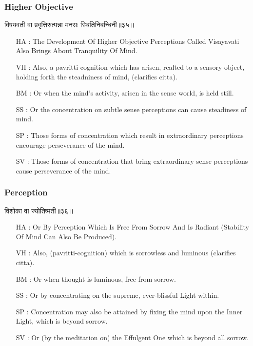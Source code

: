 \begin{frame}[fragile]\frametitle{Higher Objective}
\begin{sanskrit}
विषयवती वा प्रवृत्तिरुत्पन्ना मनसः स्थितिनिबन्धिनी॥३५॥
\end{sanskrit}

	\begin{itemize}
	\item [HA]: The Development Of Higher Objective Perceptions Called Visayavati Also Brings About Tranquility Of Mind.
	\item [VH]: Also, a pavritti-cognition which has arisen, realted to a sensory object, holding forth the steadniness of mind, (clarifies citta).
	\item [BM]: Or when the mind’s activity, arisen in the sense world, is held still.
	\item [SS]: Or the concentration on subtle sense perceptions can cause steadiness of mind.
	\item [SP]: Those forms of concentration which result in extraordinary perceptions encourage perseverance of the mind.
	\item [SV]: Those forms of concentration that bring extraordinary sense perceptions cause perseverance of the mind. 
	\end{itemize}
\end{frame}




\begin{frame}[fragile]\frametitle{Perception}
\begin{sanskrit}
विशोका वा ज्योतिष्मती॥३६॥
\end{sanskrit}

	\begin{itemize}
	\item [HA]: Or By Perception Which Is Free From Sorrow And Is Radiant (Stability Of Mind Can Also Be Produced).
	\item [VH]: Also, (pavritti-cognition) which is sorrowless and luminous (clarifies citta).
	\item [BM]: Or when thought is luminous, free from sorrow.
	\item [SS]: Or by concentrating on the supreme, ever-blissful Light within.
	\item [SP]: Concentration may also be attained by fixing the mind upon the Inner Light, which is beyond sorrow.
	\item [SV]: Or (by the meditation on) the Effulgent One which is beyond all sorrow. 
	\end{itemize}
\end{frame}




